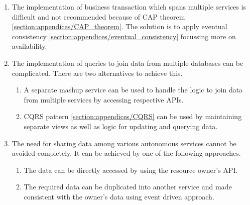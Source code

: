 \begin{enumerate}
\item The implementation of business transaction which spans multiple services is difficult and not recommended because of \acrshort{CAP} theorem \ref{section:appendices/CAP_theorem}. The solution is to apply eventual consistency \ref{section:appendices/eventual_consistency} focussing more on availability.
\item The implementation of queries to join data from multiple databases can be complicated. There are two alternatives to achieve this.
    \begin{enumerate}
        \item A separate mashup service can be used to handle the logic to join data from multiple services by accessing respective \acrshort{API}s.
        \item \acrshort{CQRS} pattern \ref{section:appendices/CQRS} can be used by maintaining separate views as well as logic for updating and querying data.
    \end{enumerate}
\item The need for sharing data among various autonomous services cannot be avoided completely. It can be achieved by one of the following approaches.
    \begin{enumerate}
        \item The data can be directly accessed by using the resource owner's \acrshort{API}.
        \item The required data can be duplicated into another service and made consistent with the owner's data using event driven approach.
    \end{enumerate}
\end{enumerate}